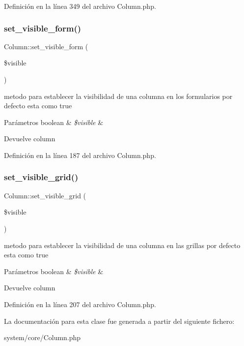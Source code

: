 Definición en la línea 349 del archivo Column.\+php.

\mbox{\label{class_column_a66009bdbc227c7cc6764f31152270e08}} 
\subsubsection{\texorpdfstring{set\_visible\_form()}{set\_visible\_form()}}
{\footnotesize\ttfamily Column\+::set\+\_\+visible\+\_\+form (\begin{DoxyParamCaption}\item[{}]{\$visible }\end{DoxyParamCaption})}

metodo para establecer la visibilidad de una columna en los formularios por defecto esta como true


\begin{DoxyParams}[1]{Parámetros}
boolean & {\em \$visible} & \\
\hline
\end{DoxyParams}
\begin{DoxyReturn}{Devuelve}
column 
\end{DoxyReturn}


Definición en la línea 187 del archivo Column.\+php.

\mbox{\label{class_column_a81a3179f6cfb539a346089975a482da5}} 
\subsubsection{\texorpdfstring{set\_visible\_grid()}{set\_visible\_grid()}}
{\footnotesize\ttfamily Column\+::set\+\_\+visible\+\_\+grid (\begin{DoxyParamCaption}\item[{}]{\$visible }\end{DoxyParamCaption})}

metodo para establecer la visibilidad de una columna en las grillas por defecto esta como true


\begin{DoxyParams}[1]{Parámetros}
boolean & {\em \$visible} & \\
\hline
\end{DoxyParams}
\begin{DoxyReturn}{Devuelve}
column 
\end{DoxyReturn}


Definición en la línea 207 del archivo Column.\+php.



La documentación para esta clase fue generada a partir del siguiente fichero\+:\begin{DoxyCompactItemize}
\item 
system/core/Column.\+php\end{DoxyCompactItemize}
